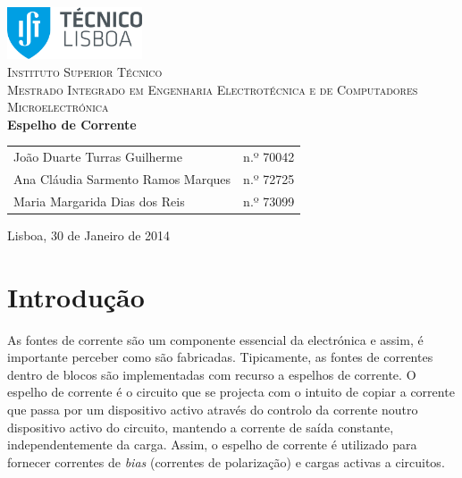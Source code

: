 \documentclass[11pt]{article}
\numberwithin{equation}{section}
\begin{document}
\begin{titlepage}
\begin{center}

\hfill \break
\hfill \break

\includegraphics[width=0.3\textwidth]{./logo}~\\[1cm]

\textsc{\LARGE Instituto Superior Técnico}\\[0.25cm]
\textsc{\Large Mestrado Integrado em Engenharia Electrotécnica e de Computadores}\\[1.8cm]
\textsc{\huge Microelectrónica}\\[0.25cm]

{\huge \bfseries Espelho de Corrente \\[1cm]}

\begin{tabular}{ l l }
João Duarte Turras Guilherme & \hspace{2mm} n.º 70042 \\
Ana Cláudia Sarmento Ramos Marques & \hspace{2mm} n.º 72725 \\
Maria Margarida Dias dos Reis & \hspace{2mm} n.º 73099
\end{tabular}

\vfill

{\large Lisboa, 30 de Janeiro de 2014} 

\end{center}
\end{titlepage}

\clearpage

\tableofcontents
\pagebreak

\clearpage
{}

\section{Introdução}

As fontes de corrente são um componente essencial da electrónica e assim, é importante perceber como são fabricadas. Tipicamente, as fontes de correntes dentro de blocos são implementadas com recurso a espelhos de corrente. O espelho de corrente é o circuito que se projecta com o intuito de copiar a corrente que passa por um dispositivo activo através do controlo da corrente noutro dispositivo activo do circuito, mantendo a corrente de saída constante, independentemente da carga. Assim, o espelho de corrente é utilizado para fornecer correntes de \textit{bias} (correntes de polarização) e cargas activas a circuitos. 
\end{document}

